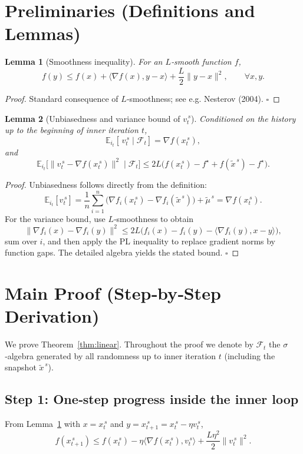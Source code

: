 \documentclass{article}
\newtheorem{lemma}{Lemma}
\begin{document}
\section*{Preliminaries (Definitions and Lemmas)}
\begin{lemma}[Smoothness inequality]\label{lem:smooth}
For an $L$‑smooth function $f$,
\[
f(y)\le f(x)+\langle\nabla f(x),y-x\rangle+\frac{L}{2}\|y-x\|^{2},\qquad\forall x,y.
\]
\end{lemma}
\begin{proof}
Standard consequence of $L$‑smoothness; see e.g. Nesterov (2004). \hfill $\square$
\end{proof}

\begin{lemma}[Unbiasedness and variance bound of $v_t^{\,s}$]\label{lem:vr}
Conditioned on the history up to the beginning of inner iteration $t$,
\[
\mathbb{E}_{i_t}[\,v_t^{\,s}\mid \mathcal{F}_t]=\nabla f(x_t^{\,s}),
\]
and
\[
\mathbb{E}_{i_t}\!\bigl[\|v_t^{\,s}-\nabla f(x_t^{\,s})\|^{2}\mid \mathcal{F}_t\bigr]
\le 2L\bigl(f(x_t^{\,s})-f^\star+f(\tilde{x}^{\,s})-f^\star\bigr).
\]
\end{lemma}
\begin{proof}
Unbiasedness follows directly from the definition:
\[
\mathbb{E}_{i_t}[v_t^{\,s}]
= \frac{1}{n}\sum_{i=1}^{n}\bigl(\nabla f_i(x_t^{\,s})-\nabla f_i(\tilde{x}^{\,s})\bigr)+\tilde{\mu}^{\,s}
= \nabla f(x_t^{\,s}) .
\]
For the variance bound, use $L$‑smoothness to obtain
\[
\|\nabla f_i(x)-\nabla f_i(y)\|^{2}\le 2L\bigl(f_i(x)-f_i(y)-\langle\nabla f_i(y),x-y\rangle\bigr),
\]
sum over $i$, and then apply the PL inequality to replace gradient norms by function gaps. The detailed algebra yields the stated bound. \hfill $\square$
\end{proof}

\section*{Main Proof (Step‑by‑Step Derivation)}
We prove Theorem~\ref{thm:linear}. Throughout the proof we denote by $\mathcal{F}_t$ the $\sigma$‑algebra generated by all randomness up to inner iteration $t$ (including the snapshot $\tilde{x}^{\,s}$).

\subsection*{Step 1: One‑step progress inside the inner loop}
From Lemma~\ref{lem:smooth} with $x=x_t^{\,s}$ and $y=x_{t+1}^{\,s}=x_t^{\,s}-\eta v_t^{\,s}$,
\[
f(x_{t+1}^{\,s})\le f(x_t^{\,s})-\eta\langle\nabla f(x_t^{\,s}),v_t^{\,s}\rangle
+\frac{L\eta^{2}}{2}\|v_t^{\,s}\|^{2}. \tag{1}
\]
\end{document}
